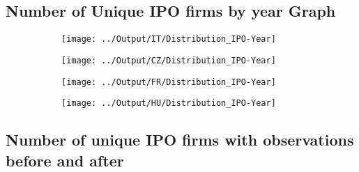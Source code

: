\documentclass[12pt,notitlepage]{article}
\begin{document}
\begin{table}[!htpb]
    \centering
    \caption{Sample Comparison - Hungary}
    \label{tab:my_label}
\end{table}

\begin{table}[!htpb]
    \centering
    \caption{Sample Comparison - Czech Republic}
    \label{tab:my_label}
\end{table}
\pagebreak


\subsection*{Number of Unique IPO firms by year Graph}

\begin{figure}[!htpb]
\centering
\caption{Distribution of IPO by year}
\begin{subfigure}{.49\textwidth}
    \centering
 \texttt{[image: ../Output/IT/Distribution\_IPO-Year]}
\end{subfigure}%
\begin{subfigure}{.49\textwidth}
    \centering
 \texttt{[image: ../Output/CZ/Distribution\_IPO-Year]}
\end{subfigure}
\begin{subfigure}{.49\textwidth}
    \centering
 \texttt{[image: ../Output/FR/Distribution\_IPO-Year]}
\end{subfigure}%
\begin{subfigure}{.49\textwidth}
    \centering
 \texttt{[image: ../Output/HU/Distribution\_IPO-Year]}
\end{subfigure}
\end{figure}
\pagebreak


\subsection*{Number of unique IPO firms with observations before and after}
\end{document}
